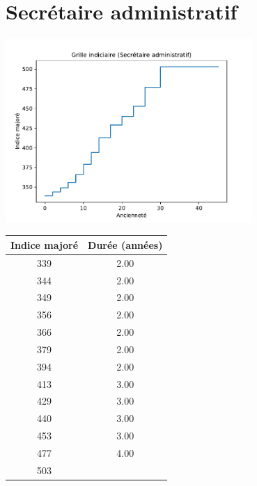 \newpage 
 
\chapter{Secrétaire administratif} 

\begin{minipage}{0.55\linewidth}\includegraphics[width=0.7\textwidth]{fig/grille_SecretaireAdmin.pdf}\end{minipage} 
\begin{minipage}{0.3\linewidth} 
 \begin{center} 

\begin{tabular}[htb]{|c|c|} 
\hline 
 Indice majoré &  Durée (années) \\ 
\hline \hline 
 339 &  2.00 \\ 
\hline 
 344 &  2.00 \\ 
\hline 
 349 &  2.00 \\ 
\hline 
 356 &  2.00 \\ 
\hline 
 366 &  2.00 \\ 
\hline 
 379 &  2.00 \\ 
\hline 
 394 &  2.00 \\ 
\hline 
 413 &  3.00 \\ 
\hline 
 429 &  3.00 \\ 
\hline 
 440 &  3.00 \\ 
\hline 
 453 &  3.00 \\ 
\hline 
 477 &  4.00 \\ 
\hline 
 503 &   \\ 
\hline 
\hline 
\end{tabular} 
\end{center} 
 \end{minipage} 


 \addto{\captionsenglish}{ \renewcommand{\mtctitle}{}} \setcounter{minitocdepth}{2} 
 \minitoc \newpage 

